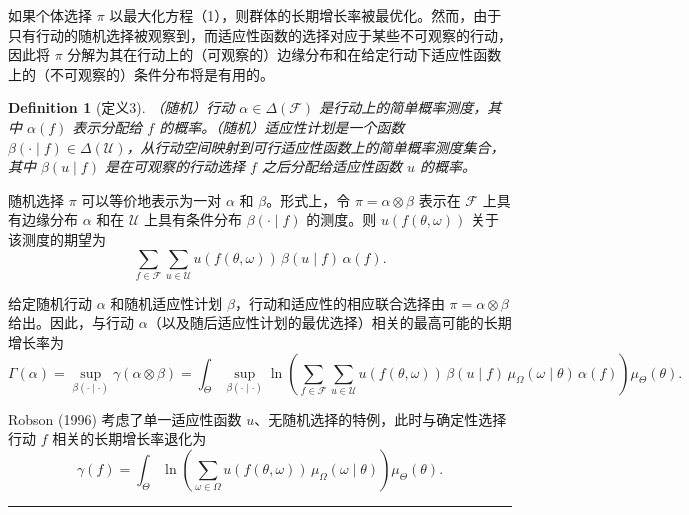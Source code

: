 \documentclass[12pt,a4paper]{article}
\newenvironment{translation}
  {\par\noindent\color{blue!70!black}\smallskip}
  {\par\medskip\hrule\medskip}
\newtheorem{definition}[theorem]{Definition}
\begin{document}
\begin{translation}
如果个体选择 $\pi$ 以最大化方程（1），则群体的长期增长率被最优化。然而，由于只有行动的随机选择被观察到，而适应性函数的选择对应于某些不可观察的行动，因此将 $\pi$ 分解为其在行动上的（可观察的）边缘分布和在给定行动下适应性函数上的（不可观察的）条件分布将是有用的。

\begin{definition}[定义3]
（随机）行动 $\alpha \in \Delta(\mathcal{F})$ 是行动上的简单概率测度，其中 $\alpha(f)$ 表示分配给 $f$ 的概率。（随机）适应性计划是一个函数 $\beta(\cdot \mid f) \in \Delta(\mathcal{U})$，从行动空间映射到可行适应性函数上的简单概率测度集合，其中 $\beta(u \mid f)$ 是在可观察的行动选择 $f$ 之后分配给适应性函数 $u$ 的概率。
\end{definition}

随机选择 $\pi$ 可以等价地表示为一对 $\alpha$ 和 $\beta$。形式上，令 $\pi = \alpha \otimes \beta$ 表示在 $\mathcal{F}$ 上具有边缘分布 $\alpha$ 和在 $\mathcal{U}$ 上具有条件分布 $\beta(\cdot \mid f)$ 的测度。则 $u(f(\theta, \omega))$ 关于该测度的期望为
\[
\sum_{f \in \mathcal{F}} \sum_{u \in \mathcal{U}} u(f(\theta, \omega)) \, \beta(u \mid f) \, \alpha(f).
\]

给定随机行动 $\alpha$ 和随机适应性计划 $\beta$，行动和适应性的相应联合选择由 $\pi = \alpha \otimes \beta$ 给出。因此，与行动 $\alpha$（以及随后适应性计划的最优选择）相关的最高可能的长期增长率为
\begin{equation}\label{eq:2}
\Gamma(\alpha) = \sup_{\beta(\cdot \mid \cdot)} \gamma(\alpha \otimes \beta)
= \int_{\Theta} \sup_{\beta(\cdot \mid \cdot)} \ln\!\left( \sum_{f \in \mathcal{F}} \sum_{u \in \mathcal{U}} u(f(\theta, \omega)) \, \beta(u \mid f) \, \mu_\Omega(\omega \mid \theta) \, \alpha(f) \right) \mu_\Theta(\theta).
\end{equation}

Robson (1996) 考虑了单一适应性函数 $u$、无随机选择的特例，此时与确定性选择行动 $f$ 相关的长期增长率退化为
\begin{equation}\label{eq:3}
\gamma(f) = \int_{\Theta} \ln\!\left( \sum_{\omega \in \Omega} u(f(\theta, \omega)) \, \mu_\Omega(\omega \mid \theta) \right) \mu_\Theta(\theta).
\end{equation}
\end{translation}
\end{document}
